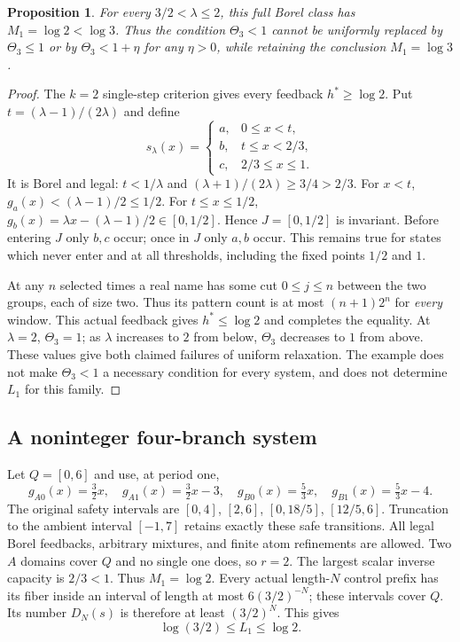 \documentclass[11pt,reqno]{amsart}
\numberwithin{equation}{section}
\newtheorem{proposition}[theorem]{Proposition}
\theoremstyle{definition}
\begin{document}
\begin{proposition}\label{prop:critical}
For every $3/2<\lambda\le2$, this full Borel class has
$M_1=\log2<\log3$. Thus the condition $\Theta_3<1$ cannot be
uniformly replaced by $\Theta_3\le1$ or by
$\Theta_3<1+\eta$ for any $\eta>0$, while retaining the
conclusion $M_1=\log3$.
\end{proposition}
\begin{proof}
The $k=2$ single-step criterion gives every feedback
$h^*\ge\log2$. Put $t=(\lambda-1)/(2\lambda)$ and define
\[
 s_\lambda(x)=\begin{cases}
 a,&0\le x<t,\\ b,&t\le x<2/3,\\ c,&2/3\le x\le1.
 \end{cases}
\]
It is Borel and legal: $t<1/\lambda$ and
$(\lambda+1)/(2\lambda)\ge3/4>2/3$.
For $x<t$, $g_a(x)<(\lambda-1)/2\le1/2$.
For $t\le x\le1/2$,
$g_b(x)=\lambda x-(\lambda-1)/2\in[0,1/2]$.
Hence $J=[0,1/2]$ is invariant. Before entering $J$ only
$b,c$ occur; once in $J$ only $a,b$ occur. This remains true
for states which never enter and at all thresholds, including the
fixed points $1/2$ and $1$.

At any $n$ selected times a real name has some cut $0\le j\le n$
between the two groups, each of size two. Thus its pattern count
is at most $(n+1)2^n$ for \emph{every} window. This actual
feedback gives $h^*\le\log2$ and completes the equality.
At $\lambda=2$, $\Theta_3=1$; as $\lambda$ increases to $2$
from below, $\Theta_3$ decreases to $1$ from above. These values
give both claimed failures of uniform relaxation. The example
does not make $\Theta_3<1$ a necessary condition for every
system, and does not determine $L_1$ for this family.
\end{proof}

\subsection{A noninteger four-branch system}
\label{subsec:four-affine}
Let $Q=[0,6]$ and use, at period one,
\[
 g_{A0}(x)=\tfrac32x,\quad g_{A1}(x)=\tfrac32x-3,
 \quad g_{B0}(x)=\tfrac53x,\quad g_{B1}(x)=\tfrac53x-4.
\]
The original safety intervals are
$[0,4]$, $[2,6]$, $[0,18/5]$, $[12/5,6]$.
Truncation to the ambient interval $[-1,7]$ retains exactly these
safe transitions. All legal Borel feedbacks, arbitrary mixtures,
and finite atom refinements are allowed. Two $A$ domains cover
$Q$ and no single one does, so $r=2$. The largest scalar
inverse capacity is $2/3<1$. Thus $M_1=\log2$.
Every actual length-$N$ control prefix has its fiber inside an
interval of length at most $6(3/2)^{-N}$; these intervals cover
$Q$. Its number $D_N(s)$ is therefore at least $(3/2)^N$.
This gives
\begin{equation}\label{eq:four-L}
 \log(3/2)\le L_1\le\log2.
\end{equation}
\end{document}

